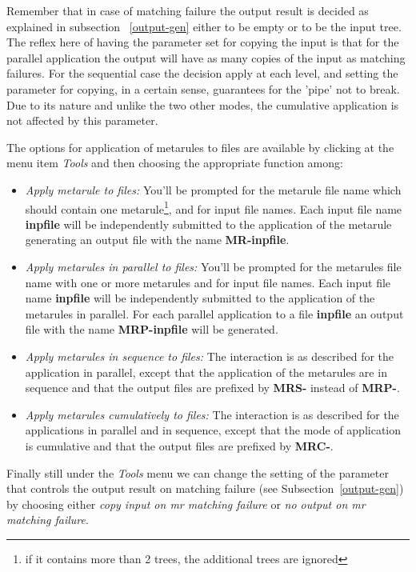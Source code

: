 Remember that in case of matching failure the output result is decided as 
explained in subsection ~\ref{output-gen} either to be empty or to be the 
input tree. The reflex here of having the parameter set for copying the input
is that for the parallel application the output will have as many copies of
the input as matching failures. For the sequential case the decision apply
at each level, and setting the parameter for copying, in a certain sense, 
guarantees for the 'pipe' not to break.
Due to its nature and unlike the two other modes, the cumulative 
application is not affected by this parameter.

The options for application of metarules to files are available by clicking
at the menu item {\it Tools} and then choosing the appropriate function
among:

\begin{itemize}
\item	{\it Apply metarule to files:}  
	You'll be prompted for the metarule file name
	which should contain one metarule\footnote{if it contains more than 
	2 trees, the additional trees are ignored}, and for input file names.
	Each input file name {\bf inpfile} will be independently submitted to 
	the application of the metarule generating an output file with the 
	name	{\bf MR-inpfile}.

\item	{\it Apply metarules in parallel to files:}
	You'll be prompted for the metarules file name with one or more 
	metarules and for input file names.
	Each input file name {\bf inpfile} will be independently submitted to 
	the application of the metarules in parallel. For each parallel 
	application to a file {\bf inpfile} an output file with the 
	name	{\bf MRP-inpfile} will be generated.

\item	{\it Apply metarules in sequence to files:}  
	The interaction is as described for the application in parallel, 
	except that
	the application of the metarules are in sequence and that 
	the output files are prefixed by {\bf MRS-} instead of {\bf MRP-}.

\item	{\it Apply metarules cumulatively to files:}  
	The interaction is as described for the applications in parallel
	and in sequence, except that the mode of application is cumulative
	and that the output files are prefixed by {\bf MRC-}.
\end{itemize}


Finally still under the {\it Tools} menu we can change the setting of the 
parameter that controls the output result on matching failure 
(see Subsection~\ref{output-gen})
by choosing
either {\it copy input on mr matching failure} or 
{\it no output on mr matching failure}.
